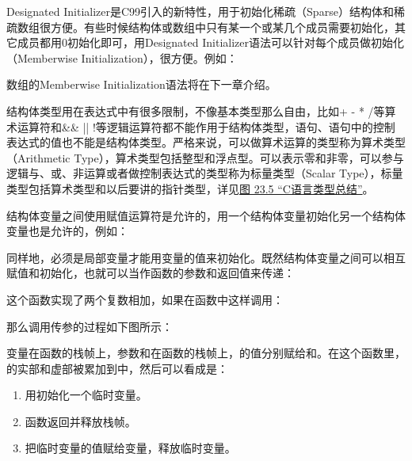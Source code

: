 Designated Initializer是C99引入的新特性，用于初始化稀疏（Sparse）结构体和稀疏数组很方便。有些时候结构体或数组中只有某一个或某几个成员需要初始化，其它成员都用0初始化即可，用Designated Initializer语法可以针对每个成员做初始化（Memberwise Initialization），很方便。例如：




数组的Memberwise Initialization语法将在下一章介绍。



结构体类型用在表达式中有很多限制，不像基本类型那么自由，比如+ - * /等算术运算符和\&\& || !等逻辑运算符都不能作用于结构体类型，语句、语句中的控制表达式的值也不能是结构体类型。严格来说，可以做算术运算的类型称为算术类型（Arithmetic Type），算术类型包括整型和浮点型。可以表示零和非零，可以参与逻辑与、或、非运算或者做控制表达式的类型称为标量类型（Scalar Type），标量类型包括算术类型和以后要讲的指针类型，详见\hyperlink{db.ch23s09.id2814014}{图 23.\BookSplit{}5 “C语言类型总结”}。



结构体变量之间使用赋值运算符是允许的，用一个结构体变量初始化另一个结构体变量也是允许的，例如：




同样地，必须是局部变量才能用变量的值来初始化。既然结构体变量之间可以相互赋值和初始化，也就可以当作函数的参数和返回值来传递：




这个函数实现了两个复数相加，如果在函数中这样调用：




那么调用传参的过程如下图所示：




变量在函数的栈帧上，参数和在函数的栈帧上，的值分别赋给和。在这个函数里，的实部和虚部被累加到中，然后可以看成是：


\begin{enumerate}

\item 用初始化一个临时变量。

\item 函数返回并释放栈帧。

\item 把临时变量的值赋给变量，释放临时变量。
\end{enumerate}


